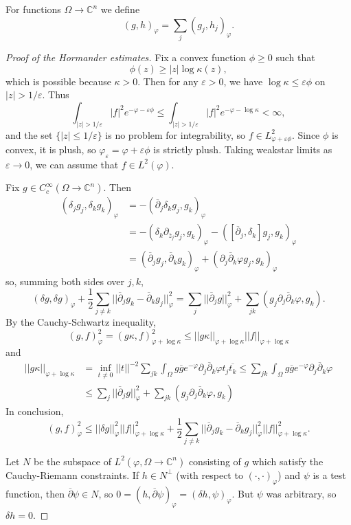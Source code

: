 \documentclass[12pt]{report}
\newcommand{\CC}{\mathbb{C}}
\newcommand{\dbar}{\overline\partial}
\theoremstyle{definition}
\begin{document}
For functions $\Omega \to \CC^n$ we define
$$(g, h)_\varphi = \sum_j (g_j, h_j)_\varphi.$$
\begin{proof}[Proof of the Hormander estimates]
    Fix a convex function $\phi \geq 0$ such that
    $$\phi(z) \geq |z| \log \kappa(z),$$
    which is possible because $\kappa > 0$. Then for any $\varepsilon > 0$, we have $\log \kappa \leq \varepsilon \phi$ on $|z| > 1/\varepsilon$. Thus
    $$\int_{|z| > 1/\varepsilon} |f|^2 e^{-\varphi - \varepsilon\phi} \leq \int_{|z| > 1/\varepsilon} |f|^2 e^{-\varphi-\log\kappa} < \infty,$$
    and the set $\{|z| \leq 1/\varepsilon\}$ is no problem for integrability, so $f \in L^2_{\varphi + \varepsilon\phi}$. Since $\phi$ is convex, it is plush, so $\varphi_\varepsilon = \varphi + \varepsilon \phi$ is strictly plush. Taking weakstar limits as $\varepsilon \to 0$, we can assume that $f \in L^2(\varphi)$.

    Fix $g \in C^\infty_c(\Omega \to \CC^n)$. Then
    \begin{align*}
(\delta_j g_j, \delta_k g_k)_\varphi &= -(\dbar_j \delta_k g_j, g_k)_\varphi \\
&= -(\delta_k \partial_{\overline{z}_j} g_j,g_k)_\varphi - ([\dbar_j, \delta_k]g_j, g_k)_\varphi \\
&= (\dbar_j g_j, \dbar_k g_k)_\varphi + (\partial_j \dbar_k \varphi g_j, g_k)_\varphi
\end{align*}
    so, summing both sides over $j, k$,
    $$(\delta g, \delta g)_\varphi + \frac{1}{2} \sum_{j \neq k} ||\dbar_j g_k - \dbar_k g_j||_\varphi^2 = \sum_j ||\dbar_j g||_\varphi^2 + \sum_{jk} (g_j \partial_j \dbar_k \varphi, g_k).$$
    By the Cauchy-Schwartz inequality,
    $$(g, f)_\varphi^2 = (g\kappa, f)_{\varphi + \log \kappa}^2 \leq ||g\kappa||_{\varphi + \log \kappa} ||f||_{\varphi + \log \kappa}$$
    and
\begin{align*}
    ||g\kappa||_{\varphi + \log \kappa}
        &= \inf_{t \neq 0} ||t||^{-2} \sum_{jk} \int_\Omega g\overline g e^{-\varphi} \partial_j \dbar_k \varphi t_j \overline{t_k}
        \leq \sum_{jk} \int_\Omega g\overline g e^{-\varphi} \partial_j \dbar_k \varphi\\
        &\leq \sum_j ||\dbar_j g||_\varphi^2 + \sum_{jk} (g_j\partial_j \dbar_k \varphi, g_k)
\end{align*}
    In conclusion,
$$(g, f)_\varphi^2 \leq ||\delta g||^2_\varphi ||f||_{\varphi + \log \kappa}^2 + \frac{1}{2} \sum_{j \neq k} ||\dbar_j g_k - \dbar_k g_j||_\varphi^2 ||f||_{\varphi + \log \kappa}^2.$$

    Let $N$ be the subspace of $L^2(\varphi, \Omega \to \CC^n)$ consisting of $g$ which satisfy the Cauchy-Riemann constraints. If $h \in N^\perp$ (with respect to $(\cdot, \cdot)_\varphi$) and $\psi$ is a test function, then $\dbar \psi \in N$, so $0 = (h, \dbar \psi)_\varphi = (\delta h, \psi)_\varphi$. But $\psi$ was arbitrary, so $\delta h = 0$.


\end{proof}
\end{document}
